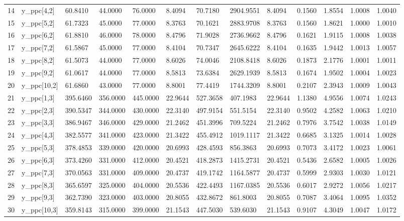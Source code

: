 \begin{table}[ht]
\begin{tabular}{rllllllllllll}
  14 & y\_ppc[4,2] &  60.8410 &  44.0000 &  76.0000 &  8.4094 &  70.7180 & 2904.9551 &  8.4094 & 0.1560 & 1.8554 & 1.0008 & 1.0040 \\ 
  15 & y\_ppc[5,2] &  61.7323 &  45.0000 &  77.0000 &  8.3763 &  70.1621 & 2883.9708 &  8.3763 & 0.1560 & 1.8621 & 1.0000 & 1.0010 \\ 
  16 & y\_ppc[6,2] &  61.8810 &  46.0000 &  78.0000 &  8.4796 &  71.9028 & 2736.9662 &  8.4796 & 0.1621 & 1.9115 & 1.0008 & 1.0038 \\ 
  17 & y\_ppc[7,2] &  61.5867 &  45.0000 &  77.0000 &  8.4104 &  70.7347 & 2645.6222 &  8.4104 & 0.1635 & 1.9442 & 1.0013 & 1.0057 \\ 
  18 & y\_ppc[8,2] &  61.5073 &  44.0000 &  77.0000 &  8.6026 &  74.0046 & 2108.8418 &  8.6026 & 0.1873 & 2.1776 & 1.0001 & 1.0011 \\ 
  19 & y\_ppc[9,2] &  61.0617 &  44.0000 &  77.0000 &  8.5813 &  73.6384 & 2629.1939 &  8.5813 & 0.1674 & 1.9502 & 1.0004 & 1.0023 \\ 
  20 & y\_ppc[10,2] &  61.6860 &  43.0000 &  77.0000 &  8.8001 &  77.4419 & 1744.3209 &  8.8001 & 0.2107 & 2.3943 & 1.0009 & 1.0043 \\ 
  21 & y\_ppc[1,3] & 395.6460 & 356.0000 & 445.0000 & 22.9644 & 527.3658 &  407.1983 & 22.9644 & 1.1380 & 4.9556 & 1.0074 & 1.0243 \\ 
  22 & y\_ppc[2,3] & 390.5347 & 344.0000 & 430.0000 & 22.3140 & 497.9154 &  551.5154 & 22.3140 & 0.9502 & 4.2582 & 1.0063 & 1.0210 \\ 
  23 & y\_ppc[3,3] & 386.9467 & 346.0000 & 429.0000 & 21.2462 & 451.3996 &  709.5224 & 21.2462 & 0.7976 & 3.7542 & 1.0038 & 1.0149 \\ 
  24 & y\_ppc[4,3] & 382.5577 & 341.0000 & 423.0000 & 21.3422 & 455.4912 & 1019.1117 & 21.3422 & 0.6685 & 3.1325 & 1.0014 & 1.0028 \\ 
  25 & y\_ppc[5,3] & 378.4853 & 339.0000 & 420.0000 & 20.6993 & 428.4593 &  856.3863 & 20.6993 & 0.7073 & 3.4172 & 1.0023 & 1.0061 \\ 
  26 & y\_ppc[6,3] & 373.4260 & 331.0000 & 412.0000 & 20.4521 & 418.2873 & 1415.2731 & 20.4521 & 0.5436 & 2.6582 & 1.0005 & 1.0026 \\ 
  27 & y\_ppc[7,3] & 370.0563 & 331.0000 & 409.0000 & 20.4737 & 419.1742 & 1164.5877 & 20.4737 & 0.5999 & 2.9303 & 1.0030 & 1.0121 \\ 
  28 & y\_ppc[8,3] & 365.6597 & 325.0000 & 404.0000 & 20.5536 & 422.4493 & 1167.0385 & 20.5536 & 0.6017 & 2.9272 & 1.0056 & 1.0217 \\ 
  29 & y\_ppc[9,3] & 362.7390 & 323.0000 & 403.0000 & 20.8055 & 432.8672 &  861.8003 & 20.8055 & 0.7087 & 3.4064 & 1.0095 & 1.0352 \\ 
  30 & y\_ppc[10,3] & 359.8143 & 315.0000 & 399.0000 & 21.1543 & 447.5030 &  539.6030 & 21.1543 & 0.9107 & 4.3049 & 1.0047 & 1.0172 \\ 
   \hline
\end{tabular}
\end{table}
